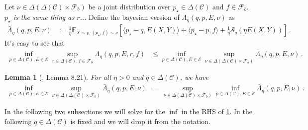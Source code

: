 \documentclass{article}
\theoremstyle{plain}
\newtheorem{lemma}[theorem]{Lemma}
\theoremstyle{definition}
\theoremstyle{remark}
\newcommand{\E}{\mathbb E}
\newcommand{\cE}{\mathcal E}
\newcommand{\cF}{\mathcal F}
\newcommand{\cS}{\mathcal S}
\newcommand{\cC}{\mathcal C}
\theoremstyle{definition}
\begin{document}
Let $\nu \in \Delta(\Delta(\cC) \times \cF_b)$ be a joint distribution over $p_\star \in \Delta(\cC)$ and $f \in \cF_b$.
\textit{$p_\star$ is the same thing as $r$...}
Define the bayesian version of $\Lambda_\eta(q, p, E, \nu)$ as
\begin{align*}
    \bar{\Lambda}_\eta(q, p, E, \nu) & :=
    \frac{1}{\eta}
    \E_{X \sim p, (p_\star, f) \sim \nu}\!\left[
        \langle p_\star - q, E(X, Y) \rangle
        + \langle p_\star - p, f \rangle
        + \frac{1}{\eta} \cS_q(\eta E(X, Y))
        \right]\,.
\end{align*}
It's easy to see that
\begin{align*}
    \inf_{p \in \Delta(\cC), E \in \cE}
    \sup_{r \in \Delta(\cC), f \in \cF_b}
    \Lambda_\eta(q, p, E, r, f)
     & \leq
    \inf_{p \in \Delta(\cC), E \in \cE}
    \sup_{\nu \in \Delta(\Delta(\cC) \times \cF_b)}
    \bar{\Lambda}_\eta(q, p, E, \nu)\,.
\end{align*}
\begin{lemma}[\cite{lattimore2024bandit}, Lemma 8.21]
    \label{lem:exp-by-opt-minimax}
    For all $\eta > 0$ and $q \in \Delta(\cC)$,  we have
    \begin{align*}
        \inf_{p \in \Delta(\cC), E \in \cE}
        \sup_{\nu \in \Delta(\Delta(\cC) \times \cF_b)}
        \bar{\Lambda}_\eta(q, p, E, \nu)
         & =
        \sup_{\nu \in \Delta(\Delta(\cC) \times \cF_b)}
        \inf_{p \in \Delta(\cC), E \in \cE}
        \bar{\Lambda}_\eta(q, p, E, \nu)\,.
    \end{align*}
\end{lemma}
In the following two subsections we will solve for the $\inf$ in the RHS of \cref{lem:exp-by-opt-minimax}. In the following $q\in \Delta(\cC)$ is fixed and we will drop it from the notation.
\end{document}

